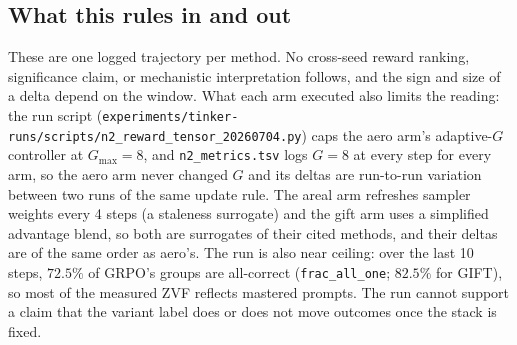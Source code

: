 \subsection{What this rules in and out}
These are one logged trajectory per method. No cross-seed reward ranking,
significance claim, or mechanistic interpretation follows, and the sign and
size of a delta depend on the window. What each arm executed also limits the
reading: the run script (\texttt{experiments/tinker-runs/scripts/n2\_reward\_tensor\_20260704.py})
caps the aero arm's adaptive-$G$ controller at $G_{\max}{=}8$, and
\texttt{n2\_metrics.tsv} logs $G{=}8$ at every step for every arm, so the aero
arm never changed $G$ and its deltas are run-to-run variation between two
runs of the same update rule. The areal arm refreshes sampler weights every
4 steps (a staleness surrogate) and the gift arm uses a simplified advantage
blend, so both are surrogates of their cited methods, and their deltas are
of the same order as aero's. The run is also near ceiling: over the last 10
steps, $72.5\%$ of GRPO's groups are all-correct (\texttt{frac\_all\_one};
$82.5\%$ for GIFT), so most of the measured ZVF reflects mastered prompts.
The run cannot support a claim that the variant label does or does not move
outcomes once the stack is fixed.
\endinput %
The measured reward deltas are all $\leq 2$pp in magnitude at the same
stack---direct quantitative corroboration of the Pillar-1 ``algorithm
barely moves outcome once stack is fixed'' reading. Two of the three
(AERO $-0.014$ and AREAL $-0.020$) are statistically significant on the
last-10 per-step scalar (CI excludes $0$; corroborated by the iter-190
raw-recompute audit in Sec.~\ref{sec:p6-iter190-raw-recompute}), but both are tiny
reward \emph{decreases}, not improvements, so the magnitude thesis holds
while the ``all within noise'' claim does not. The length / length-CV
deltas for AERO and AREAL are the largest same-stack effects, but they
are \emph{not} reward improvements: they are different
prompt--completion distributions under the same reward, with AERO and
AREAL \emph{lengthening} completions ($\sim$31 tokens) and tightening
the length-CV, consistent with sequence-level importance-ratio methods
reshaping the length distribution rather than the outcome. GIFT's loss
additive shift is a baseline constant, not an outcome.

The registry's job is to make these distinctions visible. An entry that
claims a ``DAPO'' outcome without a per-component delta status makes it
impossible to know whether the reported number reflects an algorithm
change or a stack change; the N2 row gives the registry a measured
reference for the same-stack baseline against which future entries can
be compared.

